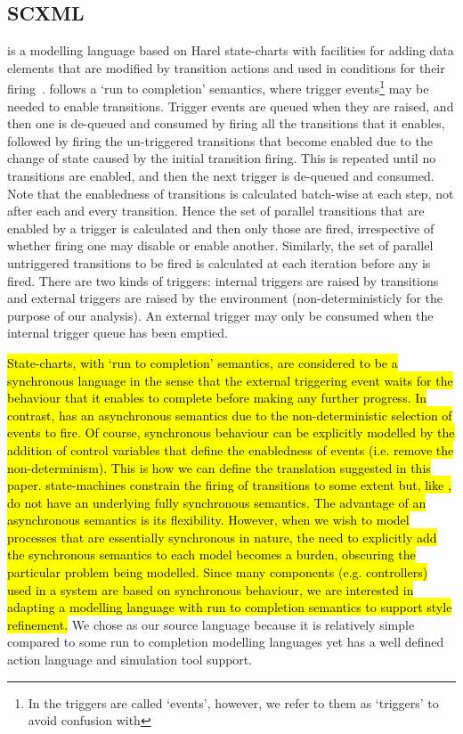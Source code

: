 
\subsection{SCXML}
\label{sec:scxml}

\SCXML is a modelling language based on Harel state-charts with facilities for adding data elements that are modified by transition actions and used in conditions for their firing~\cite{scxmlwebsite}. 
\SCXML follows a `run to completion' semantics, where trigger events\footnote{In \SCXML the triggers are called `events', however, we refer to them as `triggers' to avoid confusion with \EventB} may be needed to enable transitions.
Trigger events are queued when they are raised, and then one is de-queued and consumed by firing all the transitions that it enables, followed by firing the un-triggered transitions that become enabled due to the change of state caused by the initial transition firing.
This is repeated until no transitions are enabled, and then the next trigger is de-queued and consumed.
Note that the enabledness of transitions is calculated batch-wise at each step, not after each and every transition.
Hence the set of parallel transitions that are enabled by a trigger is calculated and then only those are fired, irrespective of whether firing one may disable or enable another.
Similarly, the set of parallel untriggered transitions to be fired is calculated at each iteration before any is fired.
There are two kinds of triggers: internal triggers are raised by transitions and external triggers are raised by the environment (non-deterministicly for the purpose of our analysis). 
An external trigger may only be consumed when the internal trigger queue has been emptied.

\hl{
State-charts, with `run to completion' semantics, are considered to be a synchronous language in the sense that the external triggering event waits for the behaviour that it enables to complete before making any further progress.
In contrast, \mbox{\EventB} has an asynchronous semantics due to the non-deterministic selection of events to fire. 
Of course, synchronous behaviour can be explicitly modelled by the addition of control variables that define the enabledness of events (i.e. remove the non-determinism).
This is how we can define the translation suggested in this paper.
\mbox{\UMLB} state-machines constrain the firing of transitions to some extent but, like \mbox{\EventB}, do not have an underlying fully synchronous semantics.
The advantage of an asynchronous semantics is its flexibility.
However, when we wish to model processes that are essentially synchronous in nature, the need to explicitly add the synchronous semantics to each model becomes a burden, obscuring the particular problem being modelled.
Since many components (e.g. controllers) used in a system are based on synchronous behaviour, we are interested in adapting a modelling language with run to completion semantics to support \mbox{\EventB} style refinement.
}
We chose \SCXML as our source language because it is relatively simple compared to some run to completion modelling languages yet has a well defined action language and simulation tool support.

